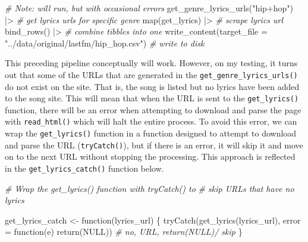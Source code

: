\documentclass[
  letterpaper,
]{scrbook}
\newenvironment{Shaded}{\begin{snugshade}}{\end{snugshade}}
\newcommand{\AttributeTok}[1]{\textcolor[rgb]{0.00,0.00,0.00}{#1}}
\newcommand{\CommentTok}[1]{\textcolor[rgb]{0.00,0.00,0.00}{\textit{#1}}}
\newcommand{\ConstantTok}[1]{\textcolor[rgb]{0.00,0.00,0.00}{#1}}
\newcommand{\ControlFlowTok}[1]{\textcolor[rgb]{0.00,0.00,0.00}{#1}}
\newcommand{\FunctionTok}[1]{\textcolor[rgb]{0.00,0.00,0.00}{#1}}
\newcommand{\NormalTok}[1]{\textcolor[rgb]{0.00,0.00,0.00}{#1}}
\newcommand{\OtherTok}[1]{\textcolor[rgb]{0.00,0.00,0.00}{#1}}
\newcommand{\SpecialCharTok}[1]{\textcolor[rgb]{0.00,0.00,0.00}{#1}}
\newcommand{\StringTok}[1]{\textcolor[rgb]{0.00,0.00,0.00}{#1}}
\begin{document}
\begin{Shaded}
\begin{Highlighting}[]
\CommentTok{\# Note: will run, but with occasional errors}
\FunctionTok{get\_genre\_lyrics\_urls}\NormalTok{(}\StringTok{"hip+hop"}\NormalTok{) }\SpecialCharTok{|\textgreater{}} \CommentTok{\# get lyrics urls for specific genre}
  \FunctionTok{map}\NormalTok{(get\_lyrics) }\SpecialCharTok{|\textgreater{}}  \CommentTok{\# scrape lyrics url}
  \FunctionTok{bind\_rows}\NormalTok{() }\SpecialCharTok{|\textgreater{}} \CommentTok{\# combine tibbles into one}
  \FunctionTok{write\_content}\NormalTok{(}\AttributeTok{target\_file =} \StringTok{"../data/original/lastfm/hip\_hop.csv"}\NormalTok{) }\CommentTok{\# write to disk}
\end{Highlighting}
\end{Shaded}

This preceding pipeline conceptually will work. However, on my testing,
it turns out that some of the URLs that are generated in the
\texttt{get\_genre\_lyrics\_urls()} do not exist on the site. That is,
the song is listed but no lyrics have been added to the song site. This
will mean that when the URL is sent to the \texttt{get\_lyrics()}
function, there will be an error when attempting to download and parse
the page with \texttt{read\_html()} which will halt the entire process.
To avoid this error, we can wrap the \texttt{get\_lyrics()} function in
a function designed to attempt to download and parse the URL
(\texttt{tryCatch()}), but if there is an error, it will skip it and
move on to the next URL without stopping the processing. This approach
is reflected in the \texttt{get\_lyrics\_catch()} function below.

\begin{Shaded}
\begin{Highlighting}[]
\CommentTok{\# Wrap the \textasciigrave{}get\_lyrics()\textasciigrave{} function with \textasciigrave{}tryCatch()\textasciigrave{} to }
\CommentTok{\# skip URLs that have no lyrics}

\NormalTok{get\_lyrics\_catch }\OtherTok{\textless{}{-}} \ControlFlowTok{function}\NormalTok{(lyrics\_url) \{}
  \FunctionTok{tryCatch}\NormalTok{(}\FunctionTok{get\_lyrics}\NormalTok{(lyrics\_url), }
           \AttributeTok{error =} \ControlFlowTok{function}\NormalTok{(e) }\FunctionTok{return}\NormalTok{(}\ConstantTok{NULL}\NormalTok{)) }\CommentTok{\# no, URL, return(NULL)/ skip}
\NormalTok{\}}
\end{Highlighting}
\end{Shaded}
\end{document}
